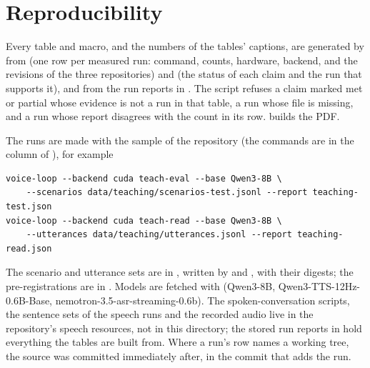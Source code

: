 
\section{Reproducibility}\label{sec:repro}

Every table and macro, and the numbers of the tables' captions, are generated by  from  (one row per measured run: command, counts, hardware, backend, and the
revisions of the three repositories) and  (the status of each claim and the run that supports it), and from the run reports in .
The script refuses a claim marked met or partial whose evidence is not a run in that table, a run whose file is missing, and a run whose report disagrees with the count in its row.  builds the PDF.

The runs are made with the  sample of the repository (the commands are in the  column of ), for example
\begin{small}
\begin{verbatim}
voice-loop --backend cuda teach-eval --base Qwen3-8B \
    --scenarios data/teaching/scenarios-test.jsonl --report teaching-test.json
voice-loop --backend cuda teach-read --base Qwen3-8B \
    --utterances data/teaching/utterances.jsonl --report teaching-read.json
\end{verbatim}
\end{small}
The scenario and utterance sets are in , written by  and , with their digests; the pre-registrations are in . Models are fetched with  (Qwen3-8B, Qwen3-TTS-12Hz-0.6B-Base, nemotron-3.5-asr-streaming-0.6b).
The spoken-conversation scripts, the sentence sets of the speech runs and the recorded audio live in the repository's speech resources, not in this directory; the stored run reports in  hold everything the tables are built from. Where a run's row names a working tree, the source was committed immediately after, in the commit that adds the run.
